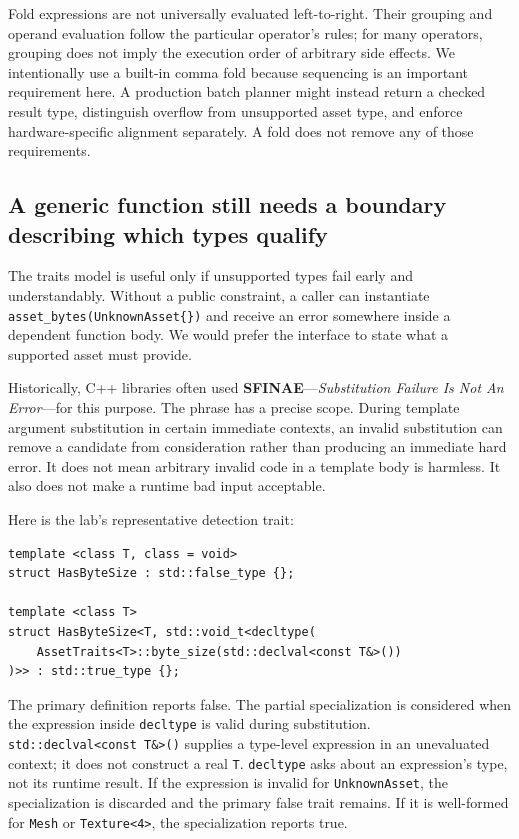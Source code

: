 Fold expressions are not universally evaluated left-to-right. Their grouping and operand evaluation follow the particular operator's rules; for many operators, grouping does not imply the execution order of arbitrary side effects. We intentionally use a built-in comma fold because sequencing is an important requirement here. A production batch planner might instead return a checked result type, distinguish overflow from unsupported asset type, and enforce hardware-specific alignment separately. A fold does not remove any of those requirements.

\subsection{A generic function still needs a boundary describing which types qualify}\label{01-foundations-i-ch005-a-generic-function-still-needs-a-boundary-describing-which-types-qualify}

The traits model is useful only if unsupported types fail early and understandably. Without a public constraint, a caller can instantiate \texttt{asset\_bytes(UnknownAsset\{\})} and receive an error somewhere inside a dependent function body. We would prefer the interface to state what a supported asset must provide.

Historically, C++ libraries often used \textbf{SFINAE}---\emph{Substitution Failure Is Not An Error}---for this purpose. The phrase has a precise scope. During template argument substitution in certain immediate contexts, an invalid substitution can remove a candidate from consideration rather than producing an immediate hard error. It does not mean arbitrary invalid code in a template body is harmless. It also does not make a runtime bad input acceptable.

Here is the lab's representative detection trait:

\begin{verbatim}
template <class T, class = void>
struct HasByteSize : std::false_type {};

template <class T>
struct HasByteSize<T, std::void_t<decltype(
    AssetTraits<T>::byte_size(std::declval<const T&>())
)>> : std::true_type {};
\end{verbatim}

The primary definition reports false. The partial specialization is considered when the expression inside \texttt{decltype} is valid during substitution. \texttt{std::declval\textless{}const\ T\&\textgreater{}()} supplies a type-level expression in an unevaluated context; it does not construct a real \texttt{T}. \texttt{decltype} asks about an expression's type, not its runtime result. If the expression is invalid for \texttt{UnknownAsset}, the specialization is discarded and the primary false trait remains. If it is well-formed for \texttt{Mesh} or \texttt{Texture\textless{}4\textgreater{}}, the specialization reports true.


